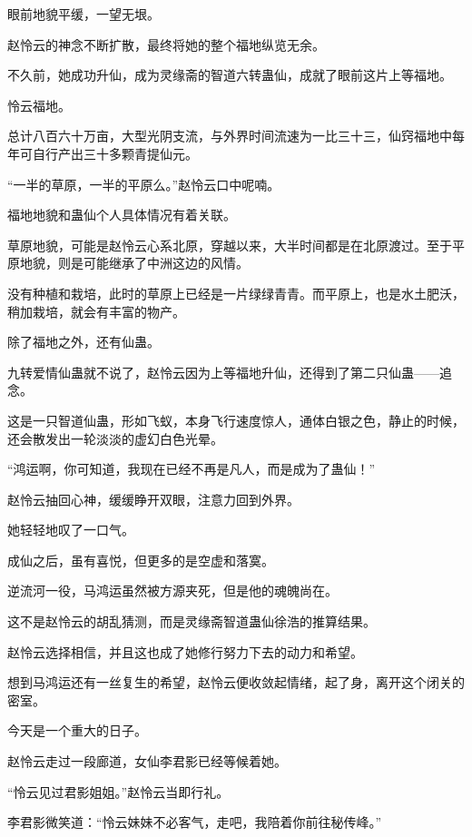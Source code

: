 
\begin{this_body}



眼前地貌平缓，一望无垠。

赵怜云的神念不断扩散，最终将她的整个福地纵览无余。

不久前，她成功升仙，成为灵缘斋的智道六转蛊仙，成就了眼前这片上等福地。

怜云福地。

总计八百六十万亩，大型光阴支流，与外界时间流速为一比三十三，仙窍福地中每年可自行产出三十多颗青提仙元。

“一半的草原，一半的平原么。”赵怜云口中呢喃。

福地地貌和蛊仙个人具体情况有着关联。

草原地貌，可能是赵怜云心系北原，穿越以来，大半时间都是在北原渡过。至于平原地貌，则是可能继承了中洲这边的风情。

没有种植和栽培，此时的草原上已经是一片绿绿青青。而平原上，也是水土肥沃，稍加栽培，就会有丰富的物产。

除了福地之外，还有仙蛊。

九转爱情仙蛊就不说了，赵怜云因为上等福地升仙，还得到了第二只仙蛊——追念。

这是一只智道仙蛊，形如飞蚁，本身飞行速度惊人，通体白银之色，静止的时候，还会散发出一轮淡淡的虚幻白色光晕。

“鸿运啊，你可知道，我现在已经不再是凡人，而是成为了蛊仙！”

赵怜云抽回心神，缓缓睁开双眼，注意力回到外界。

她轻轻地叹了一口气。

成仙之后，虽有喜悦，但更多的是空虚和落寞。

逆流河一役，马鸿运虽然被方源夹死，但是他的魂魄尚在。

这不是赵怜云的胡乱猜测，而是灵缘斋智道蛊仙徐浩的推算结果。

赵怜云选择相信，并且这也成了她修行努力下去的动力和希望。

想到马鸿运还有一丝复生的希望，赵怜云便收敛起情绪，起了身，离开这个闭关的密室。

今天是一个重大的日子。

赵怜云走过一段廊道，女仙李君影已经等候着她。

“怜云见过君影姐姐。”赵怜云当即行礼。

李君影微笑道：“怜云妹妹不必客气，走吧，我陪着你前往秘传峰。”


\end{this_body}
